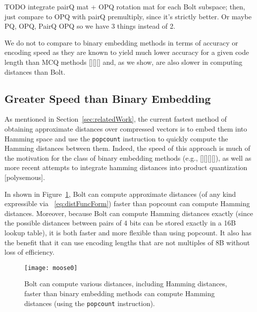 TODO integrate pairQ mat + OPQ rotation mat for each Bolt subspace; then, just compare to OPQ with pairQ premultiply, since it's strictly better. Or maybe PQ, OPQ, PairQ OPQ so we have 3 things instead of 2.

We do not to compare to binary embedding methods in terms of accuracy or encoding speed as they are known to yield much lower accuracy for a given code length than MCQ methods [][][] and, as we show, are also slower in computing distances than Bolt.


\subsection{Greater Speed than Binary Embedding}

As mentioned in Section~\ref{sec:relatedWork}, the current fastest method of obtaining approximate distances over compressed vectors is to embed them into Hamming space and use the \texttt{popcount} instruction to quickly compute the Hamming distances between them. Indeed, the speed of this approach is much of the motivation for the class of binary embedding methods (e.g., [][][][]), as well as more recent attempts to integrate hamming distances into product quantization [polysemous].

In shown in Figure~\ref{fig:bolt_vs_popcount}, Bolt can compute approximate distances (of any kind expressible via ~\ref{eq:distFuncForm}) faster than popcount can compute Hamming distances. Moreover, because Bolt can compute Hamming distances exactly (since the possible distances between pairs of 4 bits can be stored exactly in a 16B lookup table), it is both faster and more flexible than using popcount. It also has the benefit that it can use encoding lengths that are not multiples of 8B without loss of efficiency.

\begin{figure}[h]
\begin{center}
\label{fig:bolt_vs_popcount}
\texttt{[image: moose0]}
\vspace*{-1mm}
\caption{Bolt can compute various distances, including Hamming distances, faster than binary embedding methods can compute Hamming distances (using the \texttt{popcount} instruction).}
\end{center}
\end{figure}

